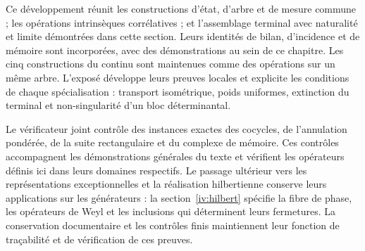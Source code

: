 Ce développement réunit les constructions d'état, d'arbre et de mesure commune ; les opérations intrinsèques corrélatives ; et l'assemblage terminal avec naturalité et limite démontrées dans cette section. Leurs identités de bilan, d'incidence et de mémoire sont incorporées, avec des démonstrations au sein de ce chapitre. Les cinq constructions du continu sont maintenues comme des opérations sur un même arbre. L'exposé développe leurs preuves locales et explicite les conditions de chaque spécialisation : transport isométrique, poids uniformes, extinction du terminal et non-singularité d'un bloc déterminantal.

Le vérificateur joint contrôle des instances exactes des cocycles, de l’annulation pondérée, de la suite rectangulaire et du complexe de mémoire. Ces contrôles accompagnent les démonstrations générales du texte et vérifient les opérateurs définis ici dans leurs domaines respectifs. Le passage ultérieur vers les représentations exceptionnelles et la réalisation hilbertienne conserve leurs applications sur les générateurs : la section~\ref{iv:hilbert} spécifie la fibre de phase, les opérateurs de Weyl et les inclusions qui déterminent leurs fermetures. La conservation documentaire et les contrôles finis maintiennent leur fonction de traçabilité et de vérification de ces preuves.
